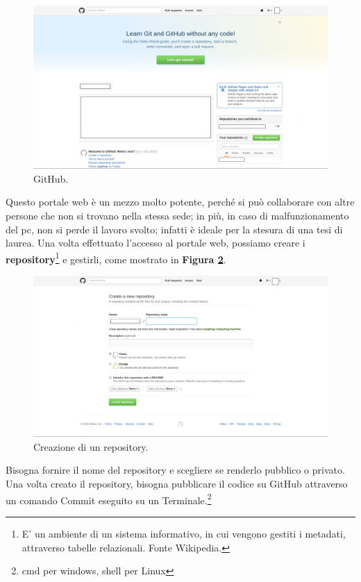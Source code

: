 \documentclass[a4paper,11pt]{article}
\begin{document}
\begin{figure}[!htpb]
	\centering
	\includegraphics[scale=0.30]{github.png}
	\caption{GitHub.}
	\label{fig:12}
\end{figure}
Questo portale web è un mezzo molto potente, perché si può collaborare con altre persone che non si trovano nella stessa sede; in più, in caso di malfunzionamento del pc, non si perde il lavoro svolto; infatti è ideale per la stesura di una tesi di laurea.\newline
Una volta effettuato l'accesso al portale web, possiamo creare i \textbf{repository}\footnote{E' un ambiente di un sistema informativo, in cui vengono gestiti i metadati, attraverso tabelle relazionali. Fonte Wikipedia.} e gestirli, come mostrato in \textbf{Figura \ref{fig:13}}.
\begin{figure}[!htpb]
	\centering
	\includegraphics[scale=0.30]{github2.png}
	\caption{Creazione di un repository.}
	\label{fig:13}
\end{figure}
\newline
Bisogna fornire il nome del repository e scegliere se renderlo pubblico o privato.
Una volta creato il repository, bisogna pubblicare il codice su GitHub attraverso un comando Commit eseguito su un Terminale.\footnote{cmd per windows, shell per Linux}
\end{document}
